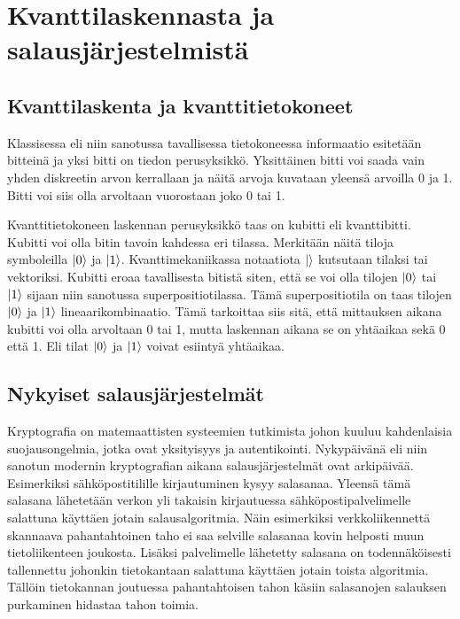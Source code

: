 \chapter{Kvanttilaskennasta ja salausjärjestelmistä\label{methods}}

\section{Kvanttilaskenta ja kvanttitietokoneet}
Klassisessa eli niin sanotussa tavallisessa tietokoneessa informaatio esitetään bitteinä ja yksi bitti on tiedon perusyksikkö. Yksittäinen bitti voi saada vain yhden diskreetin arvon kerrallaan ja näitä arvoja kuvataan yleensä arvoilla 0 ja 1. Bitti voi siis olla arvoltaan vuorostaan joko 0 tai 1.

Kvanttitietokoneen laskennan perusyksikkö taas on kubitti eli kvanttibitti. Kubitti voi olla bitin tavoin kahdessa eri tilassa. Merkitään näitä tiloja symboleilla
$\ket{0}$ ja $\ket{1}$. Kvanttimekaniikassa notaatiota $\ket{}$ kutsutaan tilaksi tai vektoriksi. Kubitti eroaa tavallisesta bitistä siten, että se voi olla tilojen $\ket{0}$ tai $\ket{1}$ sijaan niin sanotussa superpositiotilassa. Tämä superpositiotila on taas tilojen $\ket{0}$ ja $\ket{1}$ lineaarikombinaatio. Tämä tarkoittaa siis sitä, että mittauksen aikana kubitti voi olla arvoltaan 0 tai 1, mutta laskennan aikana se on yhtäaikaa sekä 0 että 1. Eli tilat $\ket{0}$ ja $\ket{1}$ voivat esiintyä yhtäaikaa.

\section{Nykyiset salausjärjestelmät}
Kryptografia on matemaattisten systeemien tutkimista johon kuuluu kahdenlaisia suojausongelmia, jotka ovat yksityisyys ja autentikointi. Nykypäivänä eli niin sanotun modernin kryptografian aikana salausjärjestelmät ovat arkipäivää. Esimerkiksi sähköpostitilille kirjautuminen kysyy salasanaa. Yleensä tämä salasana lähetetään verkon yli takaisin kirjautuessa sähköpostipalvelimelle salattuna käyttäen jotain salausalgoritmia. Näin esimerkiksi verkkoliikennettä skannaava pahantahtoinen taho ei saa selville salasanaa kovin helposti muun tietoliikenteen joukosta. Lisäksi palvelimelle lähetetty salasana on todennäköisesti tallennettu johonkin tietokantaan salattuna käyttäen jotain toista algoritmia. Tällöin tietokannan joutuessa pahantahtoisen tahon käsiin salasanojen salauksen purkaminen hidastaa tahon toimia.

